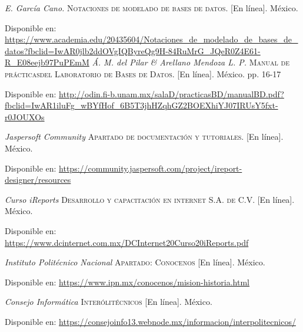 \begin{thebibliography}{}
	\textit{E. García Cano.}
	\textsc{Notaciones de modelado de bases de datos.} [En línea]. México.
	
	Disponible en:
	\url{https://www.academia.edu/20435604/Notaciones_de_modelado_de_bases_de_datos?fbclid=IwAR0jlb2ddOVgIQByreQg9H-84RuMrG_JQeR0Z4E61-R_E08eejb97PuPEmM}
	\textit{Á. M. del Pilar \& Arellano Mendoza L. P.}
	\textsc{Manual de prácticasdel Laboratorio de Bases de Datos.} [En línea]. México. pp. 16-17
	
	Disponible en: 
	\url{http://odin.fi-b.unam.mx/salaD/practicasBD/manualBD.pdf?fbclid=IwAR1iluFg_wBYfHof_6B5T3jhHZqhGZ2BOEXhiYJ07IRUsY5fxt-r0JOUXOs}
	
	
	\textit{Jaspersoft Community}
	\textsc{Apartado de documentación y tutoriales.} [En línea]. México.
	
	Disponible en: 
	\url{https://community.jaspersoft.com/project/ireport-designer/resources}	
	
	
	\textit{Curso iReports}
	\textsc{Desarrollo y capacitación en internet S.A. de C.V.} [En línea]. México.
	
	Disponible en: 
	\url{https://www.dcinternet.com.mx/DCInternet20Curso20iReports.pdf}
	
	\textit{Instituto Politécnico Nacional}
	\textsc{Apartado: Conocenos} [En línea]. México.
	
	Disponible en: 
	\url{https://www.ipn.mx/conocenos/mision-historia.html}	
	
	
	\textit{Consejo Informática}
	\textsc{Interólitécnicos} [En línea]. México.
	
	Disponible en: 
	\url{https://consejoinfo13.webnode.mx/informacion/interpolitecnicos/}
\end{thebibliography}
